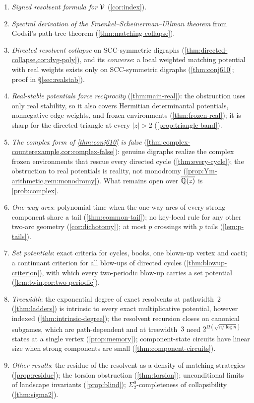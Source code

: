 \begin{enumerate}[label=(\arabic*)]
\item \emph{Signed resolvent formula for $\mathcal{V}$} (\cref{cor:index}).
\item \emph{Spectral derivation of the Fraenkel--Scheinerman--Ullman theorem} from Godsil's path-tree theorem (\cref{thm:matching-collapse}).
\item \emph{Directed resolvent collapse} on SCC-symmetric digraphs (\cref{thm:directed-collapse,cor:dvg-poly}), and its \emph{converse}: a local weighted matching potential with real weights exists only on SCC-symmetric digraphs (\cref{thm:conj610}; proof in \S\ref{sec:realstab}).
\item \emph{Real-stable potentials force reciprocity} (\cref{thm:main-real}): the obstruction uses only real stability, so it also covers Hermitian determinantal potentials, nonnegative edge weights, and frozen environments (\cref{thm:frozen-real}); it is sharp for the directed triangle at every $|z|>2$ (\cref{prop:triangle-band}).
\item \emph{The complex form of \cref{thm:conj610} is false} (\cref{thm:complex-counterexample,cor:complex-false}): genuine digraphs realize the complex frozen environments that rescue every directed cycle (\cref{thm:every-cycle}); the obstruction to real potentials is reality, not monodromy (\cref{prop:Ym-arithmetic,rem:monodromy}). What remains open over $\overline{\mathbb{Q}(z)}$ is \cref{prob:complex}.
\item \emph{One-way arcs}: polynomial time when the one-way arcs of every strong component share a tail (\cref{thm:common-tail}); no key-local rule for any other two-arc geometry (\cref{cor:dichotomy}); at most $p$ crossings with $p$ tails (\cref{lem:p-tails}).
\item \emph{Set potentials}: exact criteria for cycles, books, one blown-up vertex and cacti; a continuant criterion for all blow-ups of directed cycles (\cref{thm:blowup-criterion}), with which every two-periodic blow-up carries a set potential (\cref{lem:twin,cor:two-periodic}).
\item \emph{Treewidth}: the exponential degree of exact resolvents at pathwidth~$2$ (\cref{thm:ladders}) is intrinsic to every exact multiplicative potential, however indexed (\cref{thm:intrinsic-degree}); the resolvent recursion closes on canonical subgames, which are path-dependent and at treewidth~$3$ need $2^{\Omega(\sqrt{n/\log n})}$ states at a single vertex (\cref{prop:memory}); component-state circuits have linear size when strong components are small (\cref{thm:component-circuits}).
\item \emph{Other results}: the residue of the resolvent as a density of matching strategies (\cref{prop:residue}); the torsion obstruction (\cref{thm:torsion}); unconditional limits of landscape invariants (\cref{prop:blind}); $\Sigma^0_2$-completeness of collapsibility (\cref{thm:sigma2}).
\end{enumerate}

